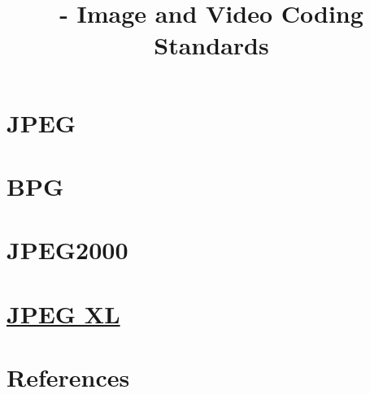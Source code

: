 
\title{\SM{} - Image and Video Coding Standards}

\maketitle

\tableofcontents

\section{JPEG}

\section{BPG}

\section{JPEG2000}

\section{ \href{https://en.wikipedia.org/wiki/JPEG_XL}{JPEG XL}}

\section{References}

\renewcommand{\addcontentsline}[3]{}%


